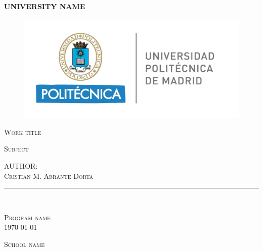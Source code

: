 \begin{titlepage}
\begin{center}
	\vspace{5 mm}
	    \textbf{\Large UNIVERSITY NAME}
	\par
	\vspace{10 mm}
	\begin{figure}[htb]
	    \centering
	    \includegraphics[scale=0.6]{images/uni-logo.png}
	\end{figure}



    \vspace{20 mm}\textsc{\Large Work title }
    \par
    \vspace{10 mm}\textsc{Subject}
    \par
    \vspace{10 mm}
    \textsc{
        AUTHOR: \\
        Cristian M. Abrante Dorta
    }
    \par
	\rule{80mm}{0.1mm}\\
	\vspace{10 mm}
	
    \textsc{Program name}\\
    \textsc{\today}
    \par
    \vspace{10 mm}\textsc{School name}		
\end{center}
\end{titlepage}
